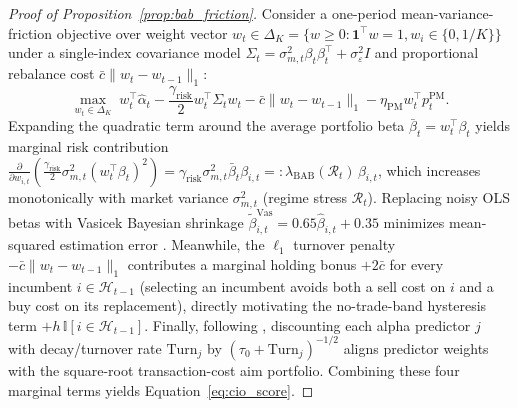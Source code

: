 \documentclass[11pt]{article}
\begin{document}
\begin{proof}[Proof of Proposition~\ref{prop:bab_friction}]
Consider a one-period mean-variance-friction objective over weight vector $w_t \in \Delta_K = \{w \ge 0 : \mathbf{1}^\top w = 1, w_i \in \{0, 1/K\}\}$ under a single-index covariance model $\Sigma_t = \sigma_{m,t}^2 \beta_t \beta_t^\top + \sigma_\varepsilon^2 I$ and proportional rebalance cost $\bar{c}\|w_t - w_{t-1}\|_1$:
\[
  \max_{w_t \in \Delta_K} \; w_t^\top \hat{\alpha}_t - \frac{\gamma_{\text{risk}}}{2} w_t^\top \Sigma_t w_t - \bar{c} \|w_t - w_{t-1}\|_1 - \eta_{\text{PM}} w_t^\top p^{\text{PM}}_t.
\]
Expanding the quadratic term around the average portfolio beta $\bar{\beta}_t = w_t^\top \beta_t$ yields marginal risk contribution $\frac{\partial}{\partial w_{i,t}}\left(\frac{\gamma_{\text{risk}}}{2} \sigma_{m,t}^2 (w_t^\top \beta_t)^2\right) = \gamma_{\text{risk}} \sigma_{m,t}^2 \bar{\beta}_t \beta_{i,t} =: \lambda_{\text{BAB}}(\mathcal{R}_t)\,\beta_{i,t}$, which increases monotonically with market variance $\sigma_{m,t}^2$ (regime stress $\mathcal{R}_t$). Replacing noisy OLS betas with Vasicek Bayesian shrinkage $\tilde{\beta}^{\text{Vas}}_{i,t} = 0.65 \hat{\beta}_{i,t} + 0.35$ minimizes mean-squared estimation error \citep{vasicek1973note}. Meanwhile, the $\ell_1$ turnover penalty $-\bar{c}\|w_t - w_{t-1}\|_1$ contributes a marginal holding bonus $+2\bar{c}$ for every incumbent $i \in \mathcal{H}_{t-1}$ (selecting an incumbent avoids both a sell cost on $i$ and a buy cost on its replacement), directly motivating the no-trade-band hysteresis term $+h\,\mathbb{I}[i \in \mathcal{H}_{t-1}]$. Finally, following \citet{garleanu2013dynamic}, discounting each alpha predictor $j$ with decay/turnover rate $\text{Turn}_j$ by $(\tau_0 + \text{Turn}_j)^{-1/2}$ aligns predictor weights with the square-root transaction-cost aim portfolio. Combining these four marginal terms yields Equation~\eqref{eq:cio_score}.
\end{proof}
\end{document}
